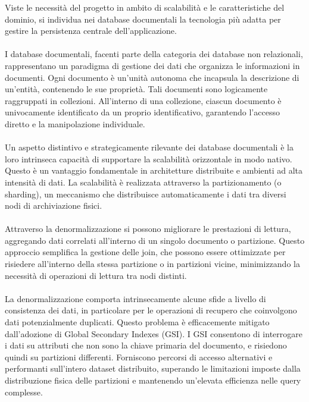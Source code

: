 Viste le necessità del progetto in ambito di scalabilità 
e le caratteristiche del dominio,
si individua nei database documentali la tecnologia più adatta 
per gestire la persistenza centrale dell'applicazione.\\
\\
I database documentali, facenti parte della categoria dei database non relazionali, 
rappresentano un paradigma di gestione dei dati
che organizza le informazioni in documenti. 
Ogni documento è un'unità autonoma che incapsula la descrizione di un'entità, 
contenendo le sue proprietà. 
Tali documenti sono logicamente raggruppati in collezioni.
All'interno di una collezione, 
ciascun documento è univocamente identificato da un proprio identificativo, 
garantendo l'accesso diretto e la manipolazione individuale.\\
\\
Un aspetto distintivo e strategicamente rilevante dei database documentali è
la loro intrinseca capacità di supportare la scalabilità orizzontale in modo nativo. 
Questo è un vantaggio fondamentale in architetture distribuite e ambienti ad alta intensità di dati. 
La scalabilità è realizzata attraverso la partizionamento (o sharding), 
un meccanismo che distribuisce automaticamente i dati tra diversi nodi di archiviazione fisici.\\
\\
Attraverso la denormalizzazione si possono migliorare le prestazioni di lettura, 
aggregando dati correlati all'interno di un singolo documento o partizione. 
Questo approccio semplifica la gestione delle join, 
che possono essere ottimizzate per risiedere all'interno della stessa partizione o 
in partizioni vicine, minimizzando la necessità di operazioni di lettura tra nodi distinti.\\
\\
La denormalizzazione comporta intrinsecamente 
alcune sfide a livello di consistenza dei dati, 
in particolare per le operazioni di recupero che coinvolgono dati potenzialmente duplicati. 
Questo problema è efficacemente mitigato dall'adozione di Global Secondary Indexes (GSI). 
I GSI consentono di interrogare i dati su attributi che non sono la chiave primaria del documento, 
e risiedono quindi su partizioni differenti.
Forniscono percorsi di accesso alternativi e performanti sull'intero dataset distribuito, 
superando le limitazioni imposte dalla distribuzione fisica delle partizioni e 
mantenendo un'elevata efficienza nelle query complesse.\\
\\
